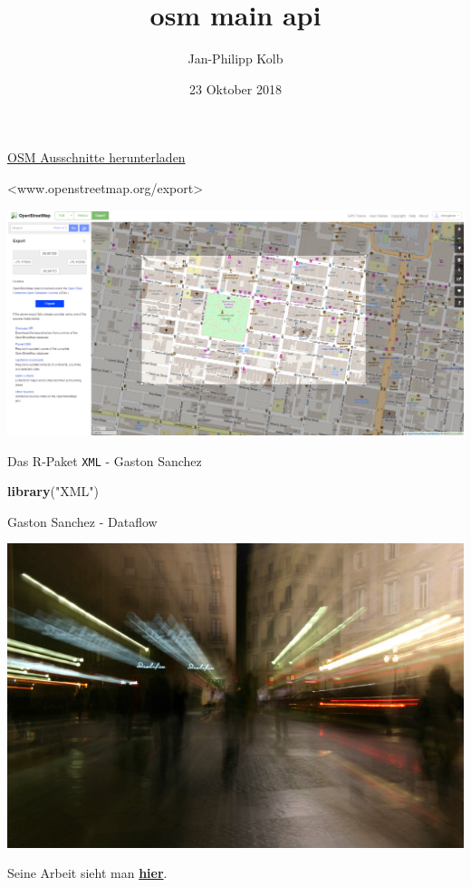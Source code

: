 \documentclass[ignorenonframetext,]{beamer}
\title{osm main api}
\author{Jan-Philipp Kolb}
\date{23 Oktober 2018}
\newenvironment{Shaded}{\begin{snugshade}}{\end{snugshade}}
\newcommand{\KeywordTok}[1]{\textcolor[rgb]{0.13,0.29,0.53}{\textbf{#1}}}
\newcommand{\NormalTok}[1]{#1}
\newcommand{\StringTok}[1]{\textcolor[rgb]{0.31,0.60,0.02}{#1}}
\begin{document}
\frame{\titlepage}

\begin{frame}{\href{http://www.openstreetmap.org/export}{OSM Ausschnitte
herunterladen}}
\protect\hypertarget{osm-ausschnitte-herunterladen}{}

\textless{}www.openstreetmap.org/export\textgreater{}

\includegraphics{figure/openstreetmap_export-1024x505.png}

\end{frame}

\begin{frame}[fragile]{Das R-Paket \texttt{XML} - Gaston Sanchez}
\protect\hypertarget{das-r-paket-xml---gaston-sanchez}{}

\begin{Shaded}
\begin{Highlighting}[]
\KeywordTok{library}\NormalTok{(}\StringTok{"XML"}\NormalTok{)}
\end{Highlighting}
\end{Shaded}

\begin{block}{Gaston Sanchez - Dataflow}

\includegraphics{figure/GastonSanchez2.png}

Seine Arbeit sieht man \href{http://gastonsanchez.com/}{\textbf{hier}}.

\end{block}

\end{frame}
\end{document}
